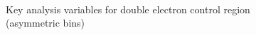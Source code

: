 \begin{figure}
\begin{center}
         \\
        \caption{Key analysis variables for double electron control region (asymmetric bins)}
        \label{fig:distribution_doubleele_asym}
    \end{center}
\end{figure}

